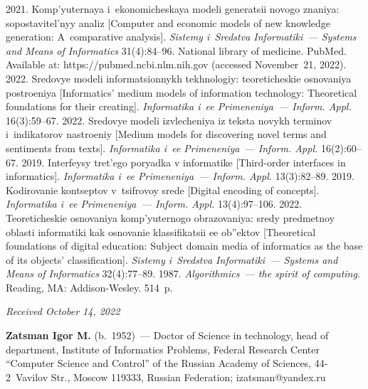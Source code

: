 \begin{multicols}{2}
{{\begin{thebibliography}{99}
 2021. Komp'yuternaya i~ekonomicheskaya modeli generatsii novogo znaniya: 
sopostavitel'nyy ana\-liz [Computer and economic models of new knowledge generation: A~comparative 
analysis]. \textit{Sistemy i~Sredstva Informatiki~--- Systems and Means of Informatics} 31(4):\mbox{84--96}.
National library of medicine. PubMed. Available at: {\sf https://pubmed.ncbi.nlm.nih.gov} (accessed 
November~21, 2022).
 2022. Sredovye modeli informatsionnykh tekhnologiy: teoreticheskie osnovaniya 
postroeniya [Informatics' medium models of information technology: Theoretical foundations for their 
creating]. \textit{Informatika i~ee Primeneniya~--- Inform. Appl.} 16(3):59--67.
 2022. Sredovye modeli izvlecheniya iz teksta 
novykh terminov i~indikatorov nastroeniy [Medium models for discovering novel terms and sentiments 
from texts]. \textit{Informatika i~ee Primeneniya~--- Inform. Appl.} 16(2):60--67.
 2019. Interfeysy tret'ego poryadka v informatike [Third-order interfaces in 
informatics]. \textit{Informatika i~ee Primeneniya~--- Inform. Appl.} 13(3):82--89.
 2019. Kodirovanie kontseptov v~tsifrovoy srede [Digital encoding of concepts]. 
\textit{Informatika i~ee Primeneniya~--- Inform. Appl.} 13(4):97--106.
 2022. Teoreticheskie osnovaniya komp'yu\-ter\-no\-go obrazovaniya: sredy predmetnoy 
oblasti informatiki kak osnovanie klassifikatsii ee ob''ektov [Theoretical foundations of digital 
education: Subject domain media of informatics as the base of its objects' classification]. \textit{Sistemy 
i~Sredstva Informatiki~--- Systems and Means of Informatics} 32(4):77--89.
 1987. \textit{Algorithmics~--- the spirit of computing}. Reading, MA: Addison-Wesley. 
514~p.

\end{thebibliography}

 }
 }

\end{multicols}

\vspace*{-6pt}

\hfill{\small\textit{Received October 14, 2022}}

\Contr

\noindent
\textbf{Zatsman Igor M.} (b.\ 1952)~--- Doctor of Science in technology, head of department, Institute 
of Informatics Problems, Federal Research Center ``Computer Science and Control'' of the Russian 
Academy of Sciences, 44-2~Vavilov Str., Moscow 119333, Russian Federation; 
\mbox{izatsman@yandex.ru}

